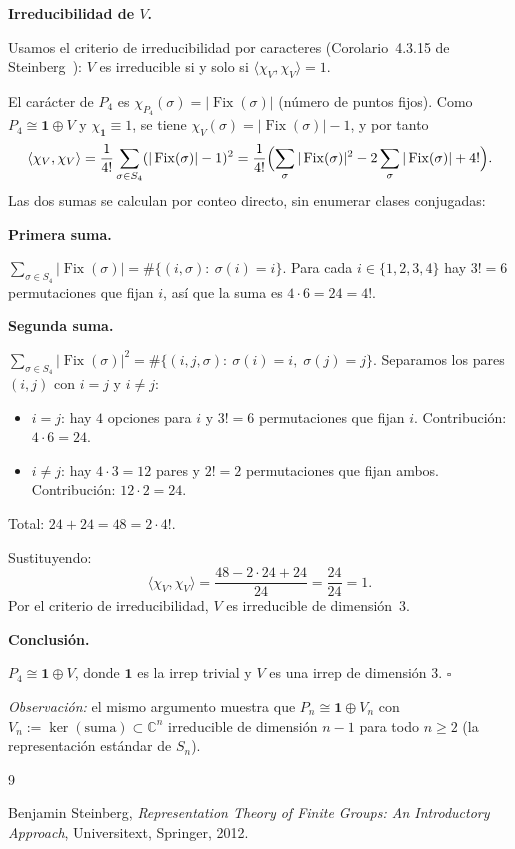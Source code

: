 \documentclass[10pt,a4paper]{article}
\newcommand{\CC}{\mathbb{C}}
\newcommand{\inlinehead}[2][repblue]{%
  \par\smallskip
  {\color{#1}\bfseries #2.}\hspace{0.45em}%
}
\newcommand{\blockhead}[2][repteal]{%
  \par\smallskip
  {\color{#1}\bfseries #2.}\par\nobreak\smallskip
}
\newcommand{\subhead}[1]{\blockhead{#1}}
\newcommand{\notehead}[1]{\inlinehead[repgray]{#1}}
\begin{document}
\subhead{Irreducibilidad de $V$}
Usamos el criterio de irreducibilidad por caracteres
(Corolario~4.3.15 de Steinberg~\cite[Cor.~4.3.15]{Steinberg}):
$V$ es irreducible si y solo si $\langle\chi_V,\chi_V\rangle=1$.

El carácter de $P_4$ es $\chi_{P_4}(\sigma)=|\operatorname{Fix}(\sigma)|$
(número de puntos fijos). Como $P_4\cong\mathbf 1\oplus V$ y $\chi_{\mathbf 1}\equiv 1$,
se tiene $\chi_V(\sigma)=|\operatorname{Fix}(\sigma)|-1$, y por tanto
\[
  \langle\chi_V,\chi_V\rangle
  =\frac{1}{4!}\sum_{\sigma\in S_4}(|\operatorname{Fix}(\sigma)|-1)^2
  =\frac{1}{4!}\Bigl(\sum_{\sigma}|\operatorname{Fix}(\sigma)|^2
    -2\sum_{\sigma}|\operatorname{Fix}(\sigma)|+4!\Bigr).
\]
Las dos sumas se calculan por conteo directo, sin enumerar clases conjugadas:

\notehead{Primera suma}
$\displaystyle\sum_{\sigma\in S_4}|\operatorname{Fix}(\sigma)|
=\#\{(i,\sigma):\ \sigma(i)=i\}$.
Para cada $i\in\{1,2,3,4\}$ hay $3!=6$ permutaciones que fijan $i$,
así que la suma es $4\cdot 6=24=4!$.

\notehead{Segunda suma}
$\displaystyle\sum_{\sigma\in S_4}|\operatorname{Fix}(\sigma)|^2
=\#\{(i,j,\sigma):\ \sigma(i)=i,\;\sigma(j)=j\}$.
Separamos los pares $(i,j)$ con $i=j$ y $i\ne j$:
\begin{itemize}[nosep,leftmargin=1.5em]
\item $i=j$: hay $4$ opciones para $i$ y $3!=6$ permutaciones que fijan $i$.
Contribución: $4\cdot 6=24$.
\item $i\ne j$: hay $4\cdot 3=12$ pares y $2!=2$ permutaciones que fijan ambos.
Contribución: $12\cdot 2=24$.
\end{itemize}
Total: $24+24=48=2\cdot 4!$.

Sustituyendo:
\[
  \langle\chi_V,\chi_V\rangle
  =\frac{48-2\cdot 24+24}{24}=\frac{24}{24}=1.
\]
Por el criterio de irreducibilidad, $V$ es irreducible de dimensión~$3$.

\subhead{Conclusión}
$P_4\cong\mathbf 1\oplus V$,
donde $\mathbf 1$ es la irrep trivial y $V$ es una irrep de dimensión $3$.
\hfill$\square$

\smallskip
{\footnotesize\textit{Observación:} el mismo argumento muestra que
$P_n\cong\mathbf 1\oplus V_n$ con $V_n:=\ker(\text{suma})\subset\CC^n$
irreducible de dimensión $n-1$ para todo $n\ge 2$
(la representación estándar de $S_n$).}

\begin{thebibliography}{9}

Benjamin Steinberg,
\textit{Representation Theory of Finite Groups: An Introductory Approach},
Universitext, Springer, 2012.

\end{thebibliography}
\end{document}
